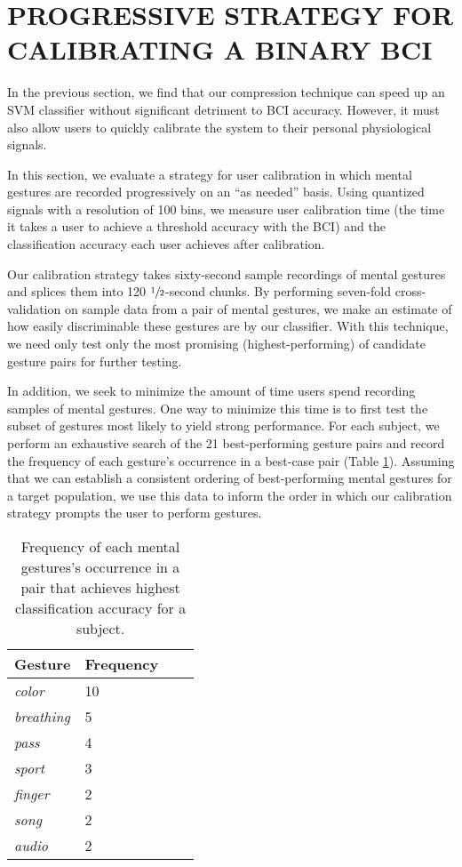 \section{\uppercase{Progressive strategy for calibrating a binary BCI}}
\label{sec:calibration_eval}

\noindent In the previous section, we find that our compression technique can speed up an SVM classifier without significant detriment to BCI accuracy. However, it must also allow users to quickly calibrate the system to their personal physiological signals.

In this section, we evaluate a strategy for user calibration in which mental gestures are recorded progressively on an ``as needed'' basis. Using  quantized signals with a resolution of 100 bins, we measure user calibration time (the time it takes a user to achieve a threshold accuracy with the BCI) and the classification accuracy each user achieves after calibration. 

Our calibration strategy takes sixty-second sample recordings of mental gestures and splices them into 120 $\sfrac{1}{2}$-second chunks. By performing seven-fold cross-validation on sample data from a pair of mental gestures, we make an estimate of how easily discriminable these gestures are by our classifier. With this technique, we need only test only the most promising (highest-performing) of candidate gesture pairs for further testing.

In addition, we seek to minimize the amount of time users spend recording samples of mental gestures. One way to minimize this time is to first test the subset of gestures most likely to yield strong performance. For each subject, we perform an exhaustive search of the 21 best-performing gesture pairs and record the frequency of each gesture's occurrence in a best-case pair (Table \ref{table:name}). Assuming that we can establish a consistent ordering of best-performing mental gestures for a target population, we use this data to inform the order in which our calibration strategy prompts the user to perform gestures.


\begin{table}[!h]
  \centering
  \begin{tabular}{ | l | l | l | p{5cm} |}
  \hline
  Gesture & Frequency \\ \hline
  \textit{color} & 10 \\ \hline
  \textit{breathing} & 5 \\ \hline
  \textit{pass} & 4 \\ \hline
  \textit{sport} & 3 \\ \hline
  \textit{finger} & 2 \\ \hline
  \textit{song} & 2 \\ \hline
  \textit{audio} & 2 \\ \hline
  \end{tabular}
  \caption{Frequency of each mental gestures's occurrence in a pair that achieves highest classification accuracy for a subject.}
  \label{table:name}
\end{table}

